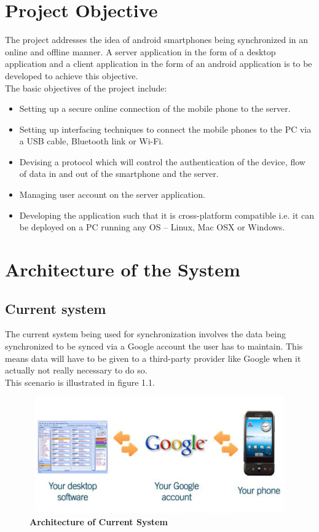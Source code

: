 \section{Project Objective}
\hspace*{0.82cm}The project addresses the idea of android smartphones being synchronized in an
online and offline manner. A server application in the form of a desktop application and a
client application in the form of an android application is to be developed to achieve this
objective.\\[0.5cm]
The basic objectives of the project include:
\begin{itemize}
 \item Setting up a secure online connection of the mobile phone to the server.
 \item Setting up interfacing techniques to connect the mobile phones to the PC via a USB
cable, Bluetooth link or Wi-Fi.
 \item Devising a protocol which will control the authentication of the device, flow of data
in and out of the smartphone and the server.
 \item Managing user account on the server application.
 \item Developing the application such that it is cross-platform compatible i.e. it can be
deployed on a PC running any OS – Linux, Mac OSX or Windows.
\end{itemize}

\section{Architecture of the System}
\subsection{Current system}
\hspace*{0.82cm}The current system being used for synchronization involves the data being
synchronized to be synced via a Google account the user has to maintain. This means data
will have to be given to a third-party provider like Google when it actually not really
necessary to do so.\\[0.5cm]
This scenario is illustrated in figure 1.1.

\begin{figure}[H]
  \centering
    \includegraphics[height= 5cm, width=13cm]{project/images/architecture-current}
  \caption{\textbf{Architecture of Current System}}
\end{figure}

